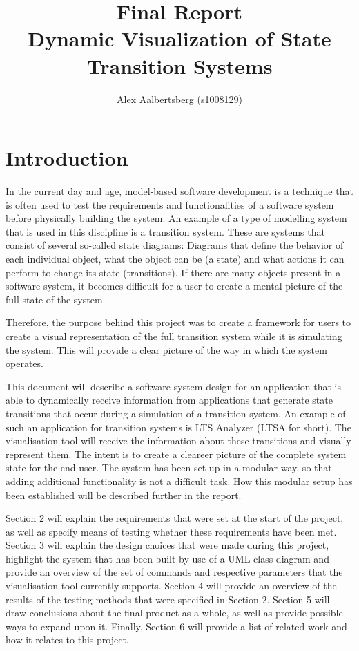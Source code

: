 \documentclass[11pt,a4paper]{article}
\begin{document}
\title{Final Report \\ \vspace{2mm} {\large Dynamic Visualization of State Transition Systems}}
\author{Alex Aalbertsberg (s1008129)}
\maketitle

\clearpage
\tableofcontents

\clearpage
\section{Introduction}

In the current day and age, model-based software development is a technique that is often used to test the requirements and functionalities of a software system before physically building the system. An example of a type of modelling system that is used in this discipline is a transition system. These are systems that consist of several so-called state diagrams: Diagrams that define the behavior of each individual object, what the object can be (a state) and what actions it can perform to change its state (transitions). If there are many objects present in a software system, it becomes difficult for a user to create a mental picture of the full state of the system.

Therefore, the purpose behind this project was to create a framework for users to create a visual representation of the full transition system while it is simulating the system. This will provide a clear picture of the way in which the system operates.

This document will describe a software system design for an application that is able to dynamically receive information from applications that generate state transitions that occur during a simulation of a transition system. An example of such an application for transition systems is LTS Analyzer (LTSA for short). The visualisation tool will receive the information about these transitions and visually represent them. The intent is to create a cleareer picture of the complete system state for the end user. The system has been set up in a modular way, so that adding additional functionality is not a difficult task. How this modular setup has been established will be described further in the report.

Section 2 will explain the requirements that were set at the start of the project, as well as specify means of testing whether these requirements have been met. Section 3 will explain the design choices that were made during this project, highlight the system that has been built by use of a UML class diagram and provide an overview of the set of commands and respective parameters that the visualisation tool currently supports. Section 4 will provide an overview of the results of the testing methods that were specified in Section 2. Section 5 will draw conclusions about the final product as a whole, as well as provide possible ways to expand upon it. Finally, Section 6 will provide a list of related work and how it relates to this project.
\end{document}
